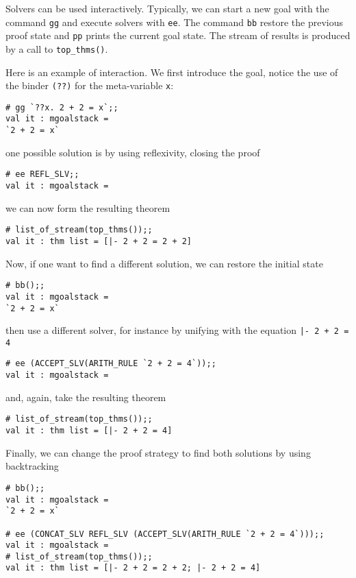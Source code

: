 
Solvers can be used interactively.  Typically, we can start a new goal
with the command \verb|gg| and execute solvers with \verb|ee|.  The
command \verb|bb| restore the previous proof state and \verb|pp|
prints the current goal state.  The stream of results is produced by
a call to \verb|top_thms()|.

Here is an example of interaction.  We first introduce the goal,
notice the use of the binder \verb|(??)| for the meta-variable \verb|x|:
\begin{verbatim}
# gg `??x. 2 + 2 = x`;;
val it : mgoalstack = 
`2 + 2 = x`
\end{verbatim}
one possible solution is by using reflexivity, closing the proof
\begin{verbatim}
# ee REFL_SLV;;
val it : mgoalstack = 
\end{verbatim}
we can now form the resulting theorem
\begin{verbatim}
# list_of_stream(top_thms());;
val it : thm list = [|- 2 + 2 = 2 + 2]
\end{verbatim}

Now, if one want to find a different solution, we can restore the
initial state
\begin{verbatim}
# bb();;
val it : mgoalstack = 
`2 + 2 = x`
\end{verbatim}
then use a different solver, for instance by unifying with the
equation \verb?|- 2 + 2 = 4?
\begin{verbatim}
# ee (ACCEPT_SLV(ARITH_RULE `2 + 2 = 4`));;
val it : mgoalstack = 
\end{verbatim}
and, again, take the resulting theorem
\begin{verbatim}
# list_of_stream(top_thms());;
val it : thm list = [|- 2 + 2 = 4]
\end{verbatim}

Finally, we can change the proof strategy to find both solutions by
using backtracking
\begin{verbatim}
# bb();;
val it : mgoalstack = 
`2 + 2 = x`

# ee (CONCAT_SLV REFL_SLV (ACCEPT_SLV(ARITH_RULE `2 + 2 = 4`)));;
val it : mgoalstack = 
# list_of_stream(top_thms());;
val it : thm list = [|- 2 + 2 = 2 + 2; |- 2 + 2 = 4]
\end{verbatim}


